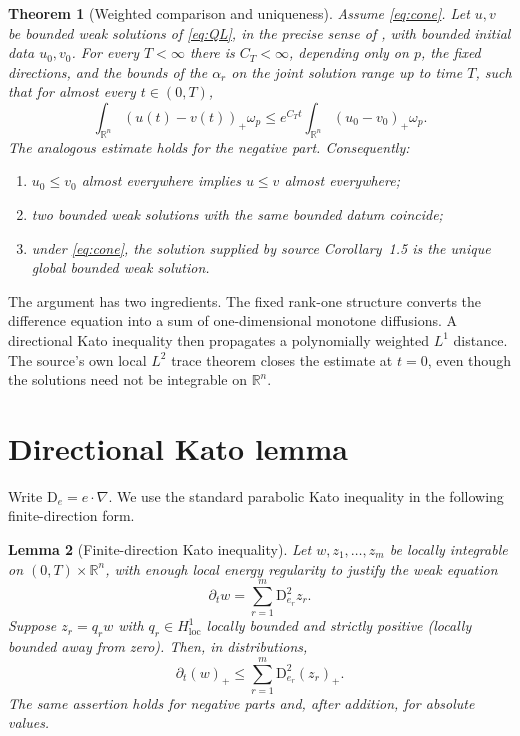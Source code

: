 \documentclass[11pt]{article}
\newtheorem{theorem}{Theorem}
\newtheorem{lemma}[theorem]{Lemma}
\newcommand{\R}{\mathbb R}
\newcommand{\D}{\mathrm D}
\begin{document}
\begin{theorem}[Weighted comparison and uniqueness]\label{thm:main}
Assume \eqref{eq:cone}.  Let $u,v$ be bounded weak solutions of
\eqref{eq:QL}, in the precise sense of \cite[Definition 1.2]{AB}, with
bounded initial data $u_0,v_0$.  For every $T<\infty$ there is
$C_T<\infty$, depending only on $p$, the fixed directions, and the bounds
of the $\alpha_r$ on the joint solution range up to time $T$, such that
for almost every $t\in(0,T)$,
\begin{equation}\label{eq:stability}
 \int_{\R^n}(u(t)-v(t))_+\omega_p
 \leq e^{C_Tt}\int_{\R^n}(u_0-v_0)_+\omega_p.
\end{equation}
The analogous estimate holds for the negative part.  Consequently:
\begin{enumerate}
\item $u_0\leq v_0$ almost everywhere implies $u\leq v$ almost everywhere;
\item two bounded weak solutions with the same bounded datum coincide;
\item under \eqref{eq:cone}, the solution supplied by source
Corollary~1.5 is the unique global bounded weak solution.
\end{enumerate}
\end{theorem}

The argument has two ingredients.  The fixed rank-one structure converts
the difference equation into a sum of one-dimensional monotone diffusions.
A directional Kato inequality then propagates a polynomially weighted
$L^1$ distance.  The source's own local $L^2$ trace theorem closes the
estimate at $t=0$, even though the solutions need not be integrable on
$\R^n$.

\section{Directional Kato lemma}

Write $\D_e=e\cdot\nabla$.  We use the standard parabolic Kato inequality
in the following finite-direction form.

\begin{lemma}[Finite-direction Kato inequality]\label{lem:kato}
Let $w,z_1,\ldots,z_m$ be locally integrable on
$(0,T)\times\R^n$, with enough local energy regularity to justify the weak
equation
\begin{equation}\label{eq:abstract}
 \partial_tw=\sum_{r=1}^m\D_{e_r}^2z_r.
\end{equation}
Suppose $z_r=q_rw$ with $q_r\in H^1_{\mathrm{loc}}$ locally bounded and
strictly positive (locally bounded away from zero).
Then, in distributions,
\begin{equation}\label{eq:kato}
 \partial_t(w)_+\leq
 \sum_{r=1}^m\D_{e_r}^2(z_r)_+.
\end{equation}
The same assertion holds for negative parts and, after addition, for
absolute values.
\end{lemma}
\end{document}

